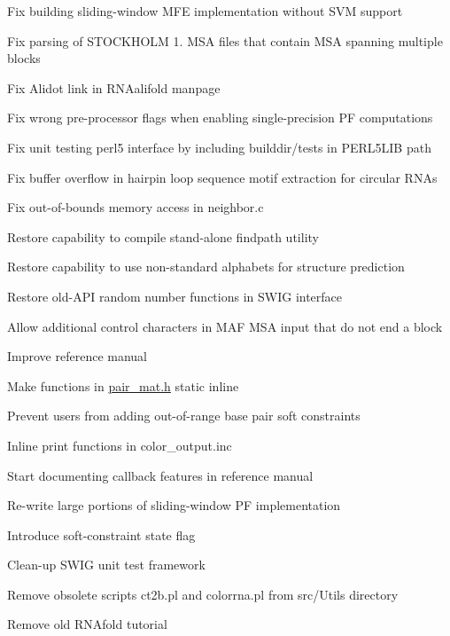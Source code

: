 \begin{DoxyItemize}
\item Fix building sliding-\/window M\+FE implementation without S\+VM support
\item Fix parsing of S\+T\+O\+C\+K\+H\+O\+LM 1. M\+SA files that contain M\+SA spanning multiple blocks
\item Fix Alidot link in R\+N\+Aalifold manpage
\item Fix wrong pre-\/processor flags when enabling single-\/precision PF computations
\item Fix unit testing perl5 interface by including builddir/tests in P\+E\+R\+L5\+L\+IB path
\item Fix buffer overflow in hairpin loop sequence motif extraction for circular R\+N\+As
\item Fix out-\/of-\/bounds memory access in neighbor.\+c
\item Restore capability to compile stand-\/alone findpath utility
\item Restore capability to use non-\/standard alphabets for structure prediction
\item Restore old-\/\+A\+PI random number functions in S\+W\+IG interface
\item Allow additional control characters in M\+AF M\+SA input that do not end a block
\item Improve reference manual
\item Make functions in \mbox{\hyperlink{pair__mat_8h}{pair\+\_\+mat.\+h}} static inline
\item Prevent users from adding out-\/of-\/range base pair soft constraints
\item Inline print functions in color\+\_\+output.\+inc
\item Start documenting callback features in reference manual
\item Re-\/write large portions of sliding-\/window PF implementation
\item Introduce soft-\/constraint state flag
\item Clean-\/up S\+W\+IG unit test framework
\item Remove obsolete scripts ct2b.\+pl and colorrna.\+pl from src/\+Utils directory
\item Remove old R\+N\+Afold tutorial
\end{DoxyItemize}

